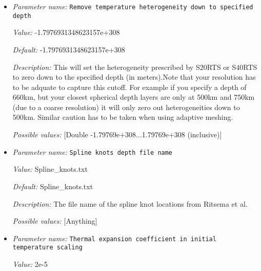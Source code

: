 \begin{itemize}
{\it Description:} Option to remove the degree zero component from the perturbation, which will ensure that the laterally averaged temperature for a fixed depth is equal to the background temperature.


{\it Possible values:} [Bool]
\item {\it Parameter name:} {\tt Remove temperature heterogeneity down to specified depth}
\label{parameters:Initial conditions/S40RTS perturbation/Remove temperature heterogeneity down to specified depth}


{\it Value:} -1.7976931348623157e+308


{\it Default:} -1.7976931348623157e+308


{\it Description:} This will set the heterogeneity prescribed by S20RTS or S40RTS to zero down to the specified depth (in meters).Note that your resolution has to be adquate to capture this cutoff. For example if you specify a depth of 660km, but your closest spherical depth layers are only at 500km and 750km (due to a coarse resolution) it will only zero out heterogeneities down to 500km. Similar caution has to be taken when using adaptive meshing.


{\it Possible values:} [Double -1.79769e+308...1.79769e+308 (inclusive)]
\item {\it Parameter name:} {\tt Spline knots depth file name}
\label{parameters:Initial conditions/S40RTS perturbation/Spline knots depth file name}


{\it Value:} Spline_knots.txt


{\it Default:} Spline_knots.txt


{\it Description:} The file name of the spline knot locations from Ritsema et al.


{\it Possible values:} [Anything]
\item {\it Parameter name:} {\tt Thermal expansion coefficient in initial temperature scaling}
\label{parameters:Initial conditions/S40RTS perturbation/Thermal expansion coefficient in initial temperature scaling}


{\it Value:} 2e-5



\end{itemize}
